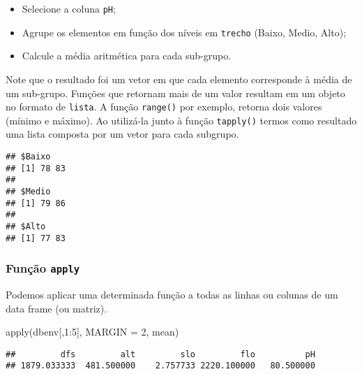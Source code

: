 \documentclass[
]{book}
\newenvironment{Shaded}{\begin{snugshade}}{\end{snugshade}}
\newcommand{\AttributeTok}[1]{\textcolor[rgb]{0.77,0.63,0.00}{#1}}
\newcommand{\DecValTok}[1]{\textcolor[rgb]{0.00,0.00,0.81}{#1}}
\newcommand{\FunctionTok}[1]{\textcolor[rgb]{0.00,0.00,0.00}{#1}}
\newcommand{\NormalTok}[1]{#1}
\newcommand{\SpecialCharTok}[1]{\textcolor[rgb]{0.00,0.00,0.00}{#1}}
\providecommand{\tightlist}{%
  \setlength{\itemsep}{0pt}\setlength{\parskip}{0pt}}
\begin{document}
\begin{itemize}
\tightlist
\item
  Selecione a coluna \texttt{pH};
\item
  Agrupe os elementos em função dos níveis em \texttt{trecho} (Baixo, Medio, Alto);
\item
  Calcule a média aritmética para cada sub-grupo.
\end{itemize}

Note que o resultado foi um vetor em que cada elemento corresponde à média de um sub-grupo. Funções que retornam mais de um valor resultam em um objeto no formato de \texttt{lista}. A função \texttt{range()} por exemplo, retorna dois valores (mínimo e máximo). Ao utilizá-la junto à função \texttt{tapply()} termos como resultado uma lista composta por um vetor para cada subgrupo.

\begin{Shaded}
\end{Shaded}

\begin{verbatim}
## $Baixo
## [1] 78 83
## 
## $Medio
## [1] 79 86
## 
## $Alto
## [1] 77 83
\end{verbatim}

\hypertarget{funuxe7uxe3o-apply}{%
\subsubsection*{\texorpdfstring{Função \texttt{apply}}{Função apply}}\label{funuxe7uxe3o-apply}}

Podemos aplicar uma determinada função a todas as linhas ou colunas de um data frame (ou matriz).

\begin{Shaded}
\begin{Highlighting}[]
\FunctionTok{apply}\NormalTok{(dbenv[,}\DecValTok{1}\SpecialCharTok{:}\DecValTok{5}\NormalTok{], }\AttributeTok{MARGIN =} \DecValTok{2}\NormalTok{, mean)}
\end{Highlighting}
\end{Shaded}

\begin{verbatim}
##         dfs         alt         slo         flo          pH 
## 1879.033333  481.500000    2.757733 2220.100000   80.500000
\end{verbatim}
\end{document}
